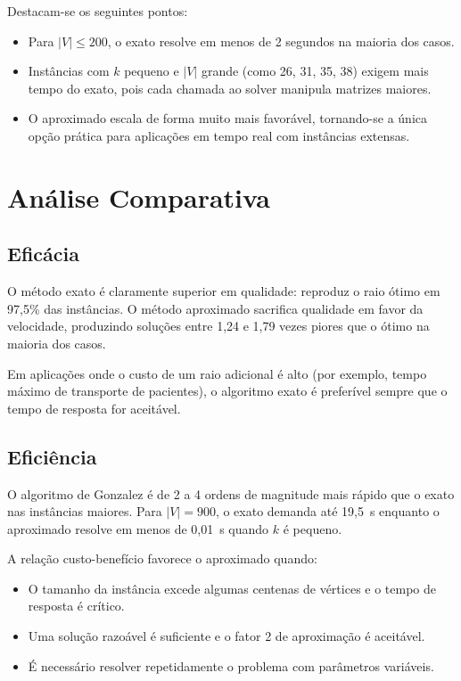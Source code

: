 \documentclass[12pt,a4paper]{article}
\begin{document}
Destacam-se os seguintes pontos:
\begin{itemize}
  \item Para $|V| \leq 200$, o exato resolve em menos de 2 segundos na maioria dos casos.
  \item Instâncias com $k$ pequeno e $|V|$ grande (como 26, 31, 35, 38) exigem mais tempo do exato, pois cada chamada ao solver manipula matrizes maiores.
  \item O aproximado escala de forma muito mais favorável, tornando-se a única opção prática para aplicações em tempo real com instâncias extensas.
\end{itemize}

\section{Análise Comparativa}

\subsection{Eficácia}

O método exato é claramente superior em qualidade: reproduz o raio ótimo em 97,5\% das instâncias. O método aproximado sacrifica qualidade em favor da velocidade, produzindo soluções entre 1,24 e 1,79 vezes piores que o ótimo na maioria dos casos.

Em aplicações onde o custo de um raio adicional é alto (por exemplo, tempo máximo de transporte de pacientes), o algoritmo exato é preferível sempre que o tempo de resposta for aceitável.

\subsection{Eficiência}

O algoritmo de Gonzalez é de 2 a 4 ordens de magnitude mais rápido que o exato nas instâncias maiores. Para $|V|=900$, o exato demanda até 19,5~s enquanto o aproximado resolve em menos de 0,01~s quando $k$ é pequeno.

A relação custo-benefício favorece o aproximado quando:
\begin{itemize}
  \item O tamanho da instância excede algumas centenas de vértices e o tempo de resposta é crítico.
  \item Uma solução razoável é suficiente e o fator 2 de aproximação é aceitável.
  \item É necessário resolver repetidamente o problema com parâmetros variáveis.
\end{itemize}
\end{document}
